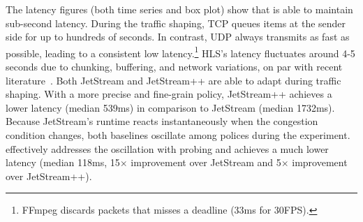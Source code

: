 
The latency figures (both time series and box plot) show that \sysname{} is able
to maintain sub-second latency. During the traffic shaping, TCP queues items at
the sender side for up to hundreds of seconds. In contrast, UDP always transmits
as fast as possible, leading to a consistent low latency.\footnote{FFmpeg
  discards packets that misses a deadline (33ms for 30FPS).} HLS's latency
fluctuates around 4-5 seconds due to chunking, buffering, and network
variations, on par with recent literature~\cite{wang2016anatomy}. Both JetStream
and JetStream++ are able to adapt during traffic shaping. With a more precise
and fine-grain policy, JetStream++ achieves a lower latency (median 539ms) in
comparison to JetStream (median 1732ms). Because JetStream's runtime reacts
instantaneously when the congestion condition changes, both baselines oscillate
among polices during the experiment. \sysname{} effectively addresses the
oscillation with probing and achieves a much lower latency (median 118ms,
15$\times$ improvement over JetStream and 5$\times$ improvement over
JetStream++).


